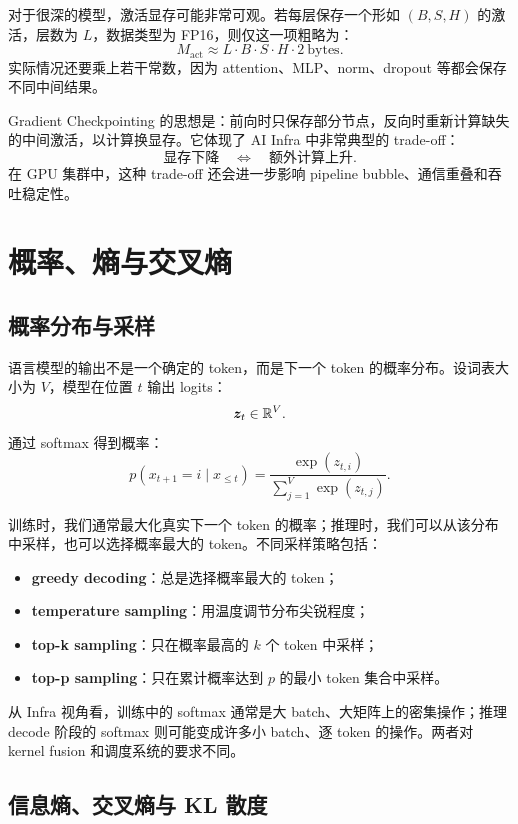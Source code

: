 对于很深的模型，激活显存可能非常可观。若每层保存一个形如 $(B,S,H)$ 的激活，层数为 $L$，数据类型为 FP16，则仅这一项粗略为：
\[
  M_{\mathrm{act}}
  \approx
  L\cdot B\cdot S\cdot H\cdot 2\ \mathrm{bytes}.
\]
实际情况还要乘上若干常数，因为 attention、MLP、norm、dropout 等都会保存不同中间结果。

Gradient Checkpointing 的思想是：前向时只保存部分节点，反向时重新计算缺失的中间激活，以计算换显存。它体现了 AI Infra 中非常典型的 trade-off：
\[
  \text{显存下降}
  \quad\Longleftrightarrow\quad
  \text{额外计算上升}.
\]
在 GPU 集群中，这种 trade-off 还会进一步影响 pipeline bubble、通信重叠和吞吐稳定性。

\section{概率、熵与交叉熵}
\label{sec:probability-entropy-crossentropy}

\subsection{概率分布与采样}
\label{subsec:distribution-sampling}

语言模型的输出不是一个确定的 token，而是下一个 token 的概率分布。设词表大小为 $V$，模型在位置 $t$ 输出 logits：
\[
  \bm{z}_t\in\mathbb{R}^{V}.
\]
通过 softmax 得到概率：
\[
  p(x_{t+1}=i\mid x_{\le t})
  =
  \frac{\exp(z_{t,i})}{\sum_{j=1}^{V}\exp(z_{t,j})}.
\]

训练时，我们通常最大化真实下一个 token 的概率；推理时，我们可以从该分布中采样，也可以选择概率最大的 token。不同采样策略包括：

\begin{itemize}
  \item \textbf{greedy decoding}：总是选择概率最大的 token；
  \item \textbf{temperature sampling}：用温度调节分布尖锐程度；
  \item \textbf{top-k sampling}：只在概率最高的 $k$ 个 token 中采样；
  \item \textbf{top-p sampling}：只在累计概率达到 $p$ 的最小 token 集合中采样。
\end{itemize}

从 Infra 视角看，训练中的 softmax 通常是大 batch、大矩阵上的密集操作；推理 decode 阶段的 softmax 则可能变成许多小 batch、逐 token 的操作。两者对 kernel fusion 和调度系统的要求不同。

\subsection{信息熵、交叉熵与 KL 散度}
\label{subsec:entropy-crossentropy-kl}

